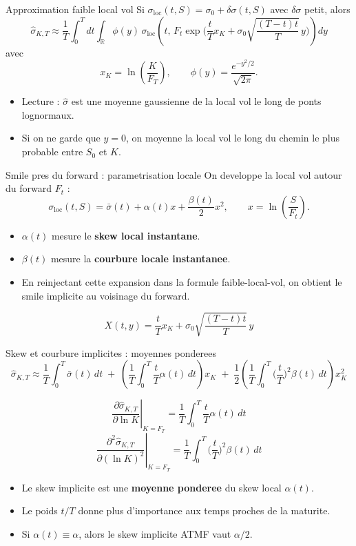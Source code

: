 \begin{frame}{Approximation faible local vol}
\small
Si \(\sigma_{\mathrm{loc}}(t,S)=\sigma_0+\delta \sigma(t,S)\) avec \(\delta \sigma\) petit, alors
\[
\hat{\sigma}_{K,T}
\approx
\frac{1}{T}
\int_0^T\!\!dt
\int_{\mathbb{R}}\phi(y)\,
\sigma_{\mathrm{loc}}\!\left(
t,\,
F_t\exp\!\Big(
\frac{t}{T}x_K+\sigma_0\sqrt{\frac{(T-t)t}{T}}\,y
\Big)
\right)dy
\]
avec
\[
x_K=\ln\!\left(\frac{K}{F_T}\right),\qquad
\phi(y)=\frac{e^{-y^2/2}}{\sqrt{2\pi}}.
\]

\begin{itemize}
    \item Lecture : \(\hat{\sigma}\) est une moyenne gaussienne de la local vol le long de ponts lognormaux.
    \item Si on ne garde que \(y=0\), on moyenne la local vol le long du chemin le plus probable entre \(S_0\) et \(K\).
\end{itemize}
\end{frame}

\begin{frame}{Smile pres du forward : parametrisation locale}
\small
On developpe la local vol autour du forward \(F_t\) :
\[
\sigma_{\mathrm{loc}}(t,S)=\bar{\sigma}(t)+\alpha(t)x+\frac{\beta(t)}{2}x^2,
\qquad
x=\ln\!\left(\frac{S}{F_t}\right).
\]

\begin{itemize}
    \item \(\alpha(t)\) mesure le \textbf{skew local instantane}.
    \item \(\beta(t)\) mesure la \textbf{courbure locale instantanee}.
    \item En reinjectant cette expansion dans la formule faible-local-vol, on obtient le smile implicite au voisinage du forward.
\end{itemize}

\[
X(t,y)=\frac{t}{T}x_K+\sigma_0\sqrt{\frac{(T-t)t}{T}}\,y
\]
\end{frame}

\begin{frame}{Skew et courbure implicites : moyennes ponderees}
\small
\[
\hat{\sigma}_{K,T}
\approx
\frac{1}{T}\int_0^T \bar{\sigma}(t)\,dt
\;+\;
\left(
\frac{1}{T}\int_0^T \frac{t}{T}\alpha(t)\,dt
\right)x_K
\;+\;
\frac{1}{2}
\left(
\frac{1}{T}\int_0^T \Big(\frac{t}{T}\Big)^2\beta(t)\,dt
\right)x_K^2
\]

\[
\left.\frac{\partial \hat{\sigma}_{K,T}}{\partial \ln K}\right|_{K=F_T}
=
\frac{1}{T}\int_0^T \frac{t}{T}\alpha(t)\,dt
\]
\[
\left.\frac{\partial^2 \hat{\sigma}_{K,T}}{\partial (\ln K)^2}\right|_{K=F_T}
=
\frac{1}{T}\int_0^T \Big(\frac{t}{T}\Big)^2\beta(t)\,dt
\]

\begin{itemize}
    \item Le skew implicite est une \textbf{moyenne ponderee} du skew local \(\alpha(t)\).
    \item Le poids \(t/T\) donne plus d'importance aux temps proches de la maturite.
    \item Si \(\alpha(t)\equiv\alpha\), alors le skew implicite ATMF vaut \(\alpha/2\).
\end{itemize}
\end{frame}


